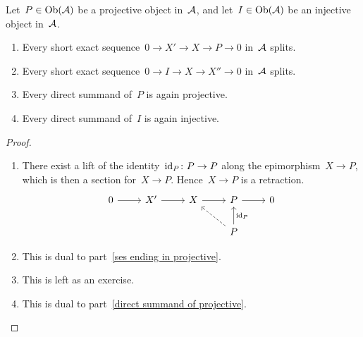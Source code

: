 \begin{lemma}
  Let~$P \in \operatorname{Ob}(\mathcal{A})$ be a projective object in~$\mathcal{A}$, and let~$I \in \operatorname{Ob}(\mathcal{A})$ be an injective object in~$\mathcal{A}$.
  \begin{enumerate}
    \item
      \label{ses ending in projective}
      Every short exact sequence~$0 \to X' \to X \to P \to 0$ in~$\mathcal{A}$ splits.
    \item
      Every short exact sequence~$0 \to I \to X \to X'' \to 0$ in~$\mathcal{A}$ splits.
    \item
      \label{direct summand of projective}
      Every direct summand of~$P$ is again projective.
    \item
      Every direct summand of~$I$ is again injective.
  \end{enumerate}
\end{lemma}


\begin{proof}
  \leavevmode
  \begin{enumerate}
    \item
      There exist a lift of the identity~$\operatorname{id}_P \colon P \to P$ along the epimorphism~$X \to P$, which is then a section for~$X \to P$.
      Hence~$X \to P$ is a retraction.
      \[
        \begin{tikzcd}
            0
            \arrow{r}
          & X'
            \arrow{r}
          & X
            \arrow{r}
          & P
            \arrow{r}
          & 0
          \\
            {}
          & {}
          & {}
          & P
            \arrow{u}[right]{\id_P}
            \arrow[dashed]{ul}
          & {}
        \end{tikzcd}
      \]
    \item
      This is dual to part~\ref*{ses ending in projective}.
    \item
      This is left as an exercise.
    \item
      This is dual to part~\ref*{direct summand of projective}.
    \qedhere
  \end{enumerate}
\end{proof}


